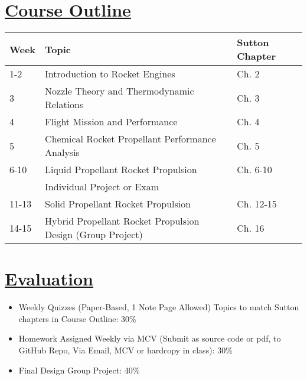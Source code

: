 \documentclass[12pt]{article}
\begin{document}
\section{\hyperref[sec:outline]{Course Outline}}
\label{sec:outline}
\begin{tabular}{lll}
\toprule
\textbf{Week} & \textbf{Topic} & \textbf{Sutton Chapter} \\
\midrule
1-2 & Introduction to Rocket Engines & Ch. 2 \\
3 & Nozzle Theory and Thermodynamic Relations & Ch. 3 \\
4 & Flight Mission and Performance & Ch. 4 \\
5 & Chemical Rocket Propellant Performance Analysis & Ch. 5 \\
6-10 & Liquid Propellant Rocket Propulsion & Ch. 6-10 \\
    & Individual Project or Exam & \\
11-13 & Solid Propellant Rocket Propulsion & Ch. 12-15 \\
14-15 & Hybrid Propellant Rocket Propulsion Design (Group Project) & Ch. 16 \\
\bottomrule
\end{tabular}

\section{\hyperref[sec:evaluation]{Evaluation}}
\label{sec:evaluation}
\begin{itemize}
    \item Weekly Quizzes (Paper-Based, 1 Note Page Allowed) Topics to match Sutton chapters in Course Outline: 30\%
    \item Homework Assigned Weekly via MCV (Submit as source code or pdf, to GitHub Repo, Via Email, MCV or hardcopy in class): 30\%
    \item Final Design Group Project: 40\%
\end{itemize}
\end{document}
